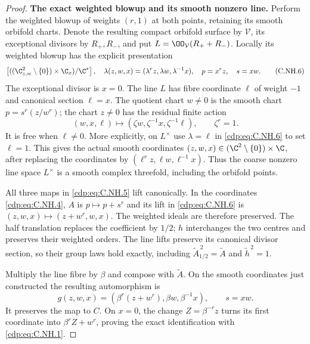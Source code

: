 \begin{proof}
\par\medskip\noindent\textbf{The exact weighted blowup and its smooth nonzero line.}
Perform the weighted blowup of weights $(r,1)$ at both
points, retaining its smooth orbifold charts. Denote the
resulting compact orbifold surface by $\mathcal V$, its
exceptional divisors by $R_+,R_-$, and put
$L=\OO_{\mathcal V}(R_++R_-)$. Locally its weighted blowup
has the explicit presentation
\[
 \left[((\C^2_{z,w}\setminus\{0\})\times\C_x)/\C^*\right],
 \quad \lambda(z,w,x)=(\lambda^r z,\lambda w,\lambda^{-1}x),
 \quad p=x^r z,\quad s=xw.
                                                        \tag{C.NH.6}\label{cdp:eq:C.NH.6}
\]
The exceptional divisor is $x=0$. The line $L$ has fibre
coordinate $\ell$ of weight $-1$ and canonical section
$\ell=x$. The quotient chart $w\ne0$ is the smooth chart
$p=s^r(z/w^r)$; the chart $z\ne0$ has the residual finite
action
\[
 (w,x,\ell)\longmapsto
      (\zeta w,\zeta^{-1}x,\zeta^{-1}\ell),\qquad \zeta^r=1.
                                                        \tag{C.NH.7}\label{cdp:eq:C.NH.7}
\]
It is free when $\ell\ne0$. More explicitly, on $L^\times$
use $\lambda=\ell$ in \eqref{cdp:eq:C.NH.6} to set $\ell=1$. This gives
the actual smooth coordinates
$(z,w,x)\in(\C^2\setminus\{0\})\times\C$, after replacing
the coordinates by $(\ell^rz,\ell w,\ell^{-1}x)$.
Thus the coarse nonzero line space $L^\times$ is a smooth
complex threefold, including the orbifold points.

All three maps in \eqref{cdp:eq:C.NH.5} lift canonically. In the
coordinates \eqref{cdp:eq:C.NH.4}, $A$ is $p\mapsto p+s^r$ and its lift
in \eqref{cdp:eq:C.NH.6} is $(z,w,x)\mapsto(z+w^r,w,x)$.
The weighted ideals are therefore preserved. The half
translation replaces the coefficient by $1/2$; $h$
interchanges the two centres and preserves their weighted
orders. The line lifts preserve its canonical divisor
section, so their group laws hold exactly, including
$\widetilde A_{1/2}^{\,2}=\widetilde A$ and
$\widetilde h^{\,2}=1$.

Multiply the line fibre by $\beta$ and compose with
$\widetilde A$. On the smooth coordinates just constructed
the resulting automorphism is
\[
 g(z,w,x)=
       (\beta^r(z+w^r),\beta w,\beta^{-1}x),
 \qquad s=xw.
                                                        \tag{C.NH.8}\label{cdp:eq:C.NH.8}
\]
It preserves the map to $C$. On $x=0$, the change
$Z=\beta^{-r}z$ turns its first coordinate into
$\beta^r Z+w^r$, proving the exact identification with
\eqref{cdp:eq:C.NH.1}.


\end{proof}
